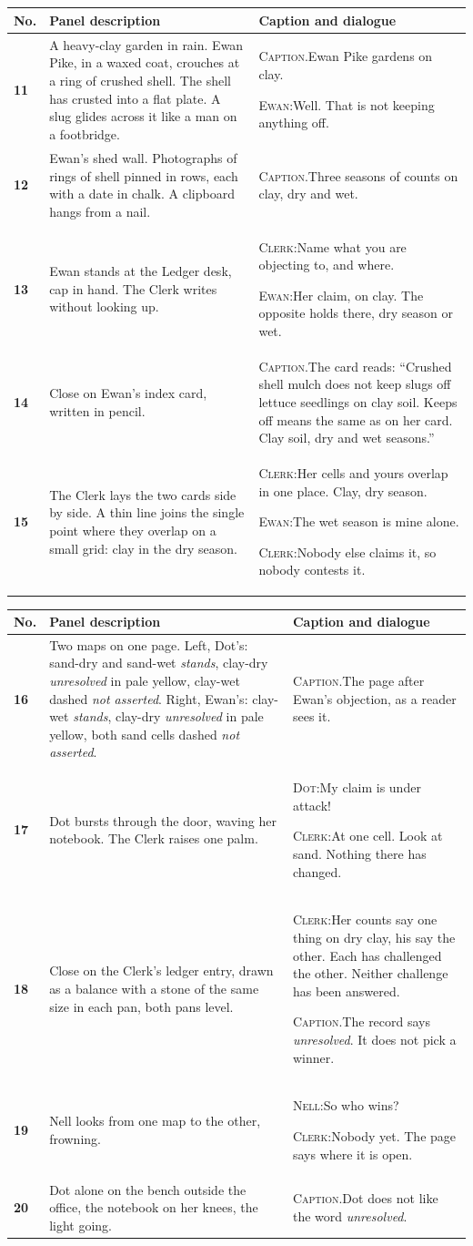 \documentclass[11pt]{article}
\makeatletter
\newcommand{\nm}[1]{\textsc{#1}}
\newcommand{\cp}[1]{\textsc{Caption.}\enspace #1\par\vspace{2pt}}
\newcommand{\sy}[2]{\nm{#1:}\enspace #2\par\vspace{2pt}}
\newcommand{\fr}[3]{\textbf{#1} & {\small #2} & {\small #3} \\ \midrule}
\newenvironment{sheet}[1]
 {\par\noindent{\footnotesize\textsc{Script page #1 of 8}}\par\vspace{2pt}\noindent
  \begin{tabular}{@{}>{\raggedright\arraybackslash}p{0.28in} >{\raggedright\arraybackslash}p{2.35in} >{\raggedright\arraybackslash}p{3.0in}@{}}\toprule
  \footnotesize No. & \footnotesize Panel description & \footnotesize Caption and dialogue \\ \midrule}
 {\end{tabular}\newpage}
\makeatother
\begin{document}
\begin{sheet}{3}
\fr{11}{A heavy-clay garden in rain. Ewan Pike, in a waxed coat, crouches at a ring of crushed shell. The shell has crusted into a flat plate. A slug glides across it like a man on a footbridge.}{\cp{Ewan Pike gardens on clay.}\sy{Ewan}{Well. That is not keeping anything off.}}
\fr{12}{Ewan's shed wall. Photographs of rings of shell pinned in rows, each with a date in chalk. A clipboard hangs from a nail.}{\cp{Three seasons of counts on clay, dry and wet.}}
\fr{13}{Ewan stands at the Ledger desk, cap in hand. The Clerk writes without looking up.}{\sy{Clerk}{Name what you are objecting to, and where.}\sy{Ewan}{Her claim, on clay. The opposite holds there, dry season or wet.}}
\fr{14}{Close on Ewan's index card, written in pencil.}{\cp{The card reads: ``Crushed shell mulch does not keep slugs off lettuce seedlings on clay soil. Keeps off means the same as on her card. Clay soil, dry and wet seasons.''}}
\fr{15}{The Clerk lays the two cards side by side. A thin line joins the single point where they overlap on a small grid: clay in the dry season.}{\sy{Clerk}{Her cells and yours overlap in one place. Clay, dry season.}\sy{Ewan}{The wet season is mine alone.}\sy{Clerk}{Nobody else claims it, so nobody contests it.}}
\end{sheet}

\begin{sheet}{4}
\fr{16}{Two maps on one page. Left, Dot's: sand-dry and sand-wet \emph{stands}, clay-dry \emph{unresolved} in pale yellow, clay-wet dashed \emph{not asserted}. Right, Ewan's: clay-wet \emph{stands}, clay-dry \emph{unresolved} in pale yellow, both sand cells dashed \emph{not asserted}.}{\cp{The page after Ewan's objection, as a reader sees it.}}
\fr{17}{Dot bursts through the door, waving her notebook. The Clerk raises one palm.}{\sy{Dot}{My claim is under attack!}\sy{Clerk}{At one cell. Look at sand. Nothing there has changed.}}
\fr{18}{Close on the Clerk's ledger entry, drawn as a balance with a stone of the same size in each pan, both pans level.}{\sy{Clerk}{Her counts say one thing on dry clay, his say the other. Each has challenged the other. Neither challenge has been answered.}\cp{The record says \emph{unresolved}. It does not pick a winner.}}
\fr{19}{Nell looks from one map to the other, frowning.}{\sy{Nell}{So who wins?}\sy{Clerk}{Nobody yet. The page says where it is open.}}
\fr{20}{Dot alone on the bench outside the office, the notebook on her knees, the light going.}{\cp{Dot does not like the word \emph{unresolved}.}}
\end{sheet}
\end{document}
